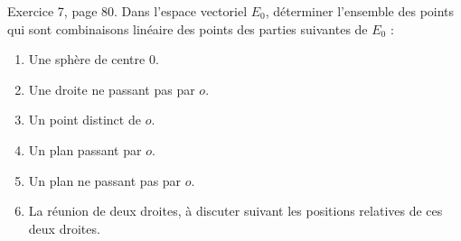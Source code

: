 \begin{exercice}\label{exoLineraire0017}

	Exercice 7, page 80. Dans l'espace vectoriel $E_0$, déterminer l'ensemble des points qui sont combinaisons linéaire des points des parties suivantes de $E_0$ :
	\begin{enumerate}

		\item
			Une sphère de centre $0$.
		\item
			Une droite ne passant pas par $o$.
		\item
			Un point distinct de $o$.
		\item
			Un plan passant par $o$.
		\item
			Un plan ne passant pas par $o$.
		\item
			La réunion de deux droites, à discuter suivant les positions relatives de ces deux droites.
	\end{enumerate}


\end{exercice}
